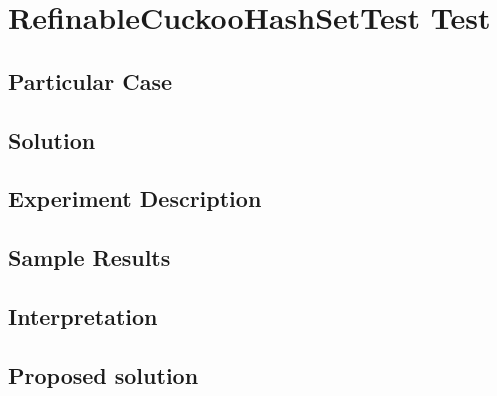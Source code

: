 \section{\textbf{RefinableCuckooHashSetTest Test}}
\subsection{Particular Case}
\par
\par
\subsection{Solution}
\par
\par
\subsection{Experiment Description}
\par
\par
\subsection{Sample Results}
\par
\par
\subsection{Interpretation}
\par
\par
\subsection{Proposed solution}
\par
\par
